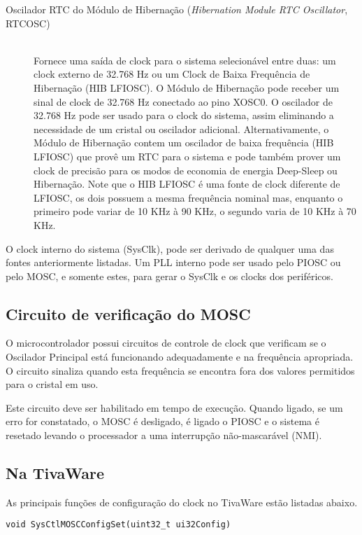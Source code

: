 \begin{description}
	\item [Oscilador RTC do Módulo de Hibernação (\emph{Hibernation Module RTC Oscillator}, RTCOSC)]\hfill \\
	Fornece uma saída de clock para o sistema selecionável entre duas: um clock externo de 32.768 Hz ou um Clock de Baixa Frequência de Hibernação (HIB LFIOSC). O Módulo de Hibernação pode receber um sinal de clock de 32.768 Hz conectado ao pino XOSC0. O oscilador de 32.768 Hz pode ser usado para o clock do sistema, assim eliminando a necessidade de um cristal ou oscilador adicional. Alternativamente, o Módulo de Hibernação contem um oscilador de baixa frequência (HIB LFIOSC) que provê um RTC para o sistema e pode também prover um clock de precisão para os modos de economia de energia Deep-Sleep ou Hibernação. Note que o HIB LFIOSC é uma fonte de clock diferente de LFIOSC, os dois possuem a mesma frequência nominal mas, enquanto o primeiro pode variar de 10 KHz à 90 KHz, o segundo varia de 10 KHz à 70 KHz.
\end{description}

O clock interno do sistema (SysClk), pode ser derivado de qualquer uma das fontes anteriormente listadas. Um PLL interno pode ser usado pelo PIOSC ou pelo MOSC, e somente estes, para gerar o SysClk e os clocks dos periféricos.

\subsection{Circuito de verificação do MOSC}

O microcontrolador possui circuitos de controle de clock que verificam se o Oscilador Principal está funcionando adequadamente e na frequência apropriada. O circuito sinaliza quando esta frequência se encontra fora dos valores permitidos para o cristal em uso.

Este circuito deve ser habilitado em tempo de execução. Quando ligado, se um erro for constatado, o MOSC é desligado, é ligado o PIOSC e o sistema é resetado levando o processador a uma interrupção não-mascarável (NMI).


\subsection{Na TivaWare}

As principais funções de configuração do clock no TivaWare estão listadas abaixo.

\begin{lstlisting}[style=funcao]
	void SysCtlMOSCConfigSet(uint32_t ui32Config)
\end{lstlisting}

